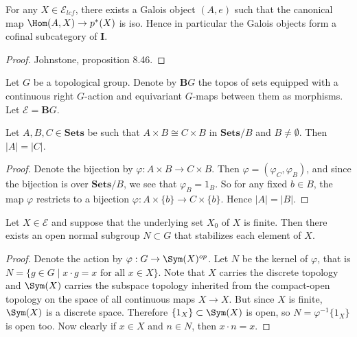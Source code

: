 \begin{proposition}
For any $X \in \mathscr{E}_{lcf}$, there exists a Galois object $(A,e)$ such that the canonical map $\Hom(A,X) \to p^*(X)$ is iso. Hence in particular the Galois objects form a cofinal subcategory of $\mathbf{I}$.
\end{proposition}
\begin{proof}
Johnstone, proposition 8.46.
\end{proof}



Let $G$ be a topological group. Denote by $\mathbf{B}G$ the topos of sets equipped with a continuous right $G$-action and equivariant $G$-maps between them as morphisms. Let $\mathscr{E} = \mathbf{B}G$.

\begin{lemma}
Let $A,B,C \in \mathbf{Sets}$ be such that $A \times B \cong C \times B$ in $\mathbf{Sets}/B$ and $B \neq \emptyset$. Then $|A| = |C|$.
\end{lemma}
\begin{proof}
Denote the bijection by $\varphi : A \times B \to C \times B$. Then $\varphi = (\varphi_C, \varphi_B)$, and since the bijection is over $\mathbf{Sets}/B$, we see that $\varphi_B = 1_B$. So for any fixed $b \in B$, the map $\varphi$ restricts to a bijection $\varphi : A \times \{b\} \to C \times \{b\}$. Hence $|A| = |B|$.
\end{proof}

\begin{lemma}
Let $X \in \mathscr{E}$ and suppose that the underlying set $X_0$ of $X$ is finite. Then there exists an open normal subgroup $N \subset G$ that stabilizes each element of $X$.
\end{lemma}
\begin{proof}
Denote the action by $\varphi : G \to \Sym(X)^{op}$. Let $N$ be the kernel of $\varphi$, that is $N = \{g \in G \mid x \cdot g = x \text{ for all } x \in X\}$. Note that $X$ carries the discrete topology and $\Sym(X)$ carries the subspace topology inherited from the compact-open topology on the space of all continuous maps $X \to X$. But since $X$ is finite, $\Sym(X)$ is a discrete space. Therefore $\{1_X\} \subset \Sym(X)$ is open, so $N = \varphi^{-1}\{1_X\}$ is open too. Now clearly if $x \in X$ and $n \in N$, then $x \cdot n = x$.
\end{proof}

